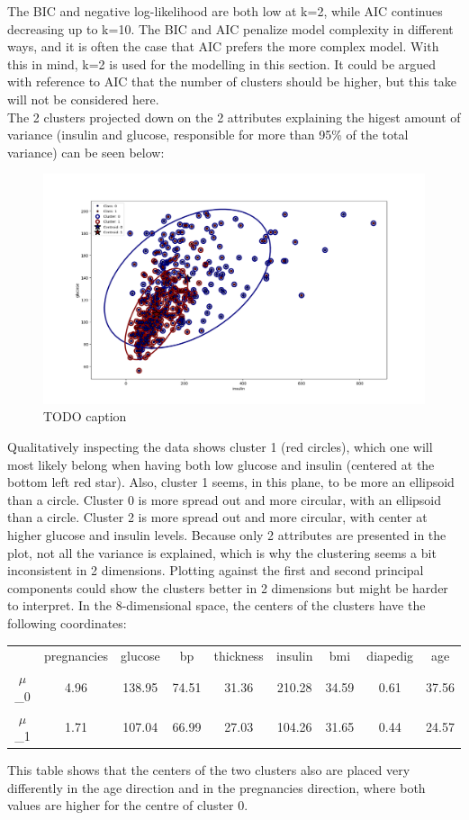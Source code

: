 The BIC and negative log-likelihood are both low at k=2, while AIC continues
decreasing up to k=10. The BIC and AIC penalize model complexity in different ways,
and it is often the case that AIC prefers the more complex model. With this in mind,
k=2 is used for the modelling in this section. It could be argued with reference to AIC
that the number of clusters should be higher, but this take will not be considered here.\\
The 2 clusters projected down on the 2 attributes explaining the higest amount
of variance (insulin and glucose, responsible for more than 95\% of the total
variance) can be seen below:\\
\begin{figure}[htbp]
  \centering
  \includegraphics[width=\textwidth]{Figure_2.png}
  \caption{TODO caption}
\end{figure}
Qualitatively inspecting the data shows cluster 1 (red circles), which one
will most likely belong when having both low glucose and insulin (centered
at the bottom left red star). Also, cluster 1 seems, in this plane, to be more
an ellipsoid than a circle. Cluster 0 is more spread out and more circular, with
an ellipsoid than a circle. Cluster 2 is more spread out and more circular, with
center at higher glucose and insulin levels.
Because only 2 attributes are presented in the plot, not all the variance is
explained, which is why the clustering seems a bit inconsistent in 2 dimensions.
Plotting against the first and second principal components could show the clusters better
in 2 dimensions but might be harder to interpret. In the 8-dimensional space, the centers
of the clusters have the following coordinates:\\
\begin{table}[h]
\centering
\begin{tabular}{ccccccccc}
    & pregnancies & glucose & bp & thickness & insulin & bmi & diapedig & age\\
$\mu$_0 & 4.96 & 138.95 & 74.51 & 31.36 & 210.28 & 34.59 & 0.61 & 37.56 \\
$\mu$_1 & 1.71 & 107.04 & 66.99 & 27.03 & 104.26 & 31.65 & 0.44 & 24.57 \\
\end{tabular}
\end{table}
This table shows that the centers of the two clusters also are placed very differently
in the age direction and in the pregnancies direction, where both values are
higher for the centre of cluster 0.


